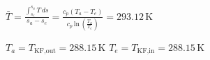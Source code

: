 \(\bar{T} = \frac{\int_{s_e}^{s_a} T \, ds}{s_a - s_e} = \frac{c_p (T_a - T_e)}{c_p \, \text{ln} \, \left( \frac{T_a}{T_e} \right)} = 293.12 \, \text{K}\)  

\(T_a = T_{\text{KF,out}} = 288.15 \, \text{K}\)  
\(T_e = T_{\text{KF,in}} = 288.15 \, \text{K}\)